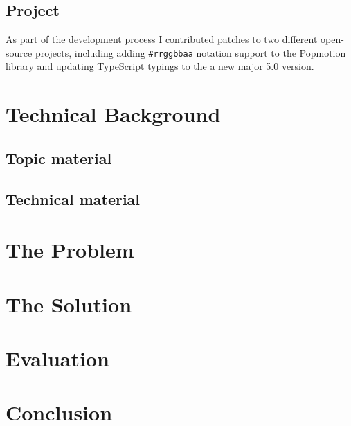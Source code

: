 \documentclass[11pt]{report}
\begin{document}
\section{Project}

As part of the development process I contributed patches to two different
open-source projects, including adding \texttt{\#rrggbbaa} notation support
to the Popmotion library\cite{github-pr-popmotion} and updating
 TypeScript typings to the a new major 5.0
version\cite{github-pr-styled-components}.

\chapter{Technical Background}
\section{Topic material}
\section{Technical material}

\chapter{The Problem}
\chapter{The Solution}
\chapter{Evaluation}
\chapter{Conclusion}

\renewcommand*{\bibfont}{\raggedright} %

\end{document}
